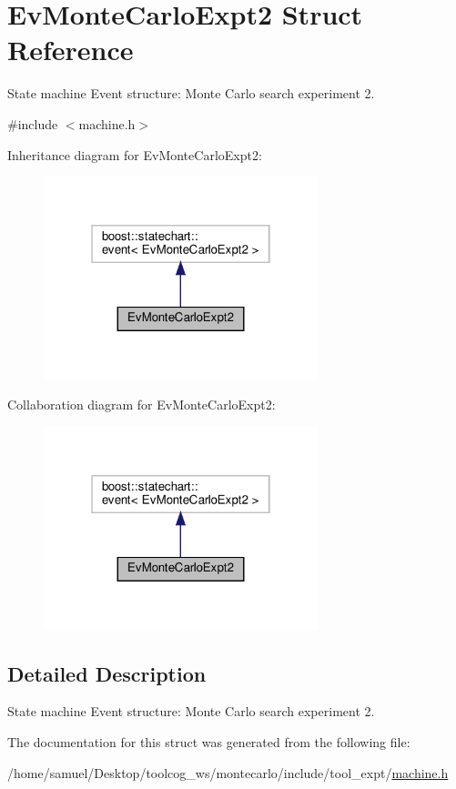 \hypertarget{structEvMonteCarloExpt2}{}\section{Ev\+Monte\+Carlo\+Expt2 Struct Reference}
\label{structEvMonteCarloExpt2}


State machine Event structure\+: Monte Carlo search experiment 2.  




{\ttfamily \#include $<$machine.\+h$>$}



Inheritance diagram for Ev\+Monte\+Carlo\+Expt2\+:
\nopagebreak
\begin{figure}[H]
\begin{center}
\leavevmode
\includegraphics[width=226pt]{structEvMonteCarloExpt2__inherit__graph}
\end{center}
\end{figure}


Collaboration diagram for Ev\+Monte\+Carlo\+Expt2\+:
\nopagebreak
\begin{figure}[H]
\begin{center}
\leavevmode
\includegraphics[width=226pt]{structEvMonteCarloExpt2__coll__graph}
\end{center}
\end{figure}


\subsection{Detailed Description}
State machine Event structure\+: Monte Carlo search experiment 2. 

The documentation for this struct was generated from the following file\+:\begin{DoxyCompactItemize}
\item 
/home/samuel/\+Desktop/toolcog\+\_\+ws/montecarlo/include/tool\+\_\+expt/\hyperlink{machine_8h}{machine.\+h}\end{DoxyCompactItemize}
